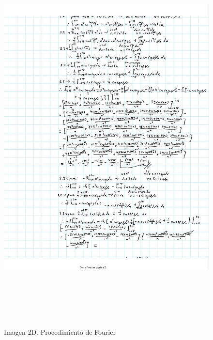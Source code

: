 \begin{figure}[H]
	\centering
	\includegraphics[width=6.26772in,height=8.11111in]{media/image56.jpg}
	\caption{Imagen 2D. Procedimiento de Fourier}
\end{figure}

